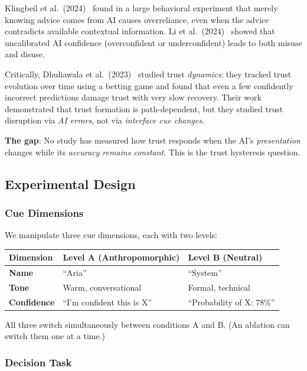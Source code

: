 \documentclass[12pt]{article}
\begin{document}
Klingbeil et al.~(2024)~\cite{klingbeil2024} found in a large behavioral experiment that merely knowing advice comes from AI causes overreliance, even when the advice contradicts available contextual information. Li et al.~(2024)~\cite{li2024} showed that uncalibrated AI confidence (overconfident or underconfident) leads to both misuse and disuse.

Critically, Dhuliawala et al.~(2023)~\cite{dhuliawala2023} studied trust \emph{dynamics}: they tracked trust evolution over time using a betting game and found that even a few confidently incorrect predictions damage trust with very slow recovery. Their work demonstrated that trust formation is path-dependent, but they studied trust disruption via \emph{AI errors}, not via \emph{interface cue changes}.

\textbf{The gap}: No study has measured how trust responds when the AI's \emph{presentation} changes while its \emph{accuracy remains constant}. This is the trust hysteresis question.

\subsection{Experimental Design}

\subsubsection{Cue Dimensions}

We manipulate three cue dimensions, each with two levels:

\begin{table}[H]
\centering
\begin{tabular}{lll}
\toprule
Dimension & Level A (Anthropomorphic) & Level B (Neutral) \\
\midrule
\textbf{Name} & ``Aria'' & ``System'' \\
\textbf{Tone} & Warm, conversational & Formal, technical \\
\textbf{Confidence} & ``I'm confident this is X'' & ``Probability of X: 78\%'' \\
\bottomrule
\end{tabular}
\end{table}

All three switch simultaneously between conditions A and B. (An ablation can switch them one at a time.)

\subsubsection{Decision Task}
\end{document}
